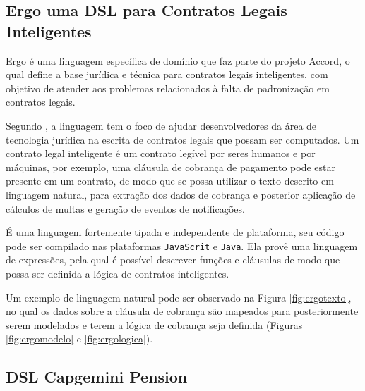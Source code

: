 






\newpage
\subsection{Ergo uma DSL para Contratos Legais Inteligentes}
\label{ergo}

Ergo é uma linguagem específica de domínio que faz parte do projeto Accord, o qual define a base jurídica e técnica para contratos legais inteligentes, com objetivo de atender aos problemas relacionados à falta de padronização em contratos legais. 

Segundo , a linguagem tem o foco de ajudar desenvolvedores da área de tecnologia jurídica na escrita de contratos legais que possam ser computados. Um contrato legal inteligente é um contrato legível por seres humanos e por máquinas, por exemplo, uma cláusula de cobrança de pagamento pode estar presente em um contrato, de modo que se possa utilizar o texto descrito em linguagem natural, para extração dos dados de cobrança e posterior aplicação de cálculos de multas e geração de eventos de notificações. 


É uma linguagem fortemente tipada e independente de plataforma, seu código pode ser compilado nas plataformas \texttt{JavaScrit} e \texttt{Java}. Ela provê uma linguagem de expressões, pela qual é possível descrever funções e cláusulas de modo que possa ser definida a lógica de contratos inteligentes. 

Um exemplo de linguagem natural pode ser observado na Figura \ref{fig:ergotexto}, no qual os dados sobre a cláusula de cobrança são mapeados para posteriormente serem modelados e terem a lógica de cobrança seja definida (Figuras \ref{fig:ergomodelo} e \ref{fig:ergologica}). 







\newpage

\subsection{DSL Capgemini Pension}
\label{capgeminipension}

